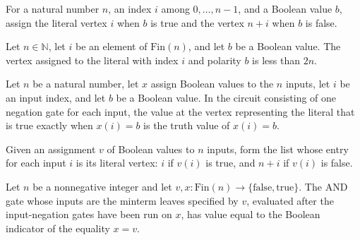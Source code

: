 \begin{definition}
\label{BoolCircuit.litVertex}
\leanok
For a natural number $n$, an index $i$ among $0,\ldots,n-1$, and a Boolean value $b$,
assign the literal vertex $i$ when $b$ is true and the vertex $n+i$ when $b$ is false.
\end{definition}

\begin{theorem}
\label{BoolCircuit.litVertex_lt}
\leanok
{}
Let $n\in\mathbb{N}$, let $i$ be an element of $\mathrm{Fin}(n)$, and let $b$ be a
Boolean value. The vertex assigned to the literal with index $i$ and polarity $b$ is
less than $2n$.
\end{theorem}

\begin{theorem}
\label{BoolCircuit.vertexValue_litVertex}
\leanok
{}
Let $n$ be a natural number, let $x$ assign Boolean values to the $n$ inputs, let $i$ be
an input index, and let $b$ be a Boolean value. In the circuit consisting of one
negation gate for each input, the value at the vertex representing the literal that is
true exactly when $x(i)=b$ is the truth value of $x(i)=b$.
\end{theorem}

\begin{definition}
\label{BoolCircuit.mintermLeaves}
\leanok
{}
Given an assignment $v$ of Boolean values to $n$ inputs, form the list whose entry for
each input $i$ is its literal vertex: $i$ if $v(i)$ is true, and $n+i$ if $v(i)$ is
false.
\end{definition}

\begin{theorem}
\label{BoolCircuit.mintermLeaves_eval}
\leanok
{}
Let $n$ be a nonnegative integer and let $v,x : \mathrm{Fin}(n) \to
\{\mathrm{false},\mathrm{true}\}$. The AND gate whose inputs are the minterm leaves
specified by $v$, evaluated after the input-negation gates have been run on $x$, has
value equal to the Boolean indicator of the equality $x=v$.
\end{theorem}

